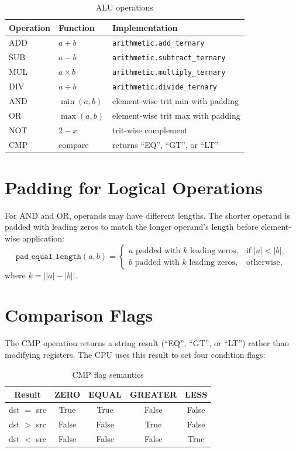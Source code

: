 \documentclass[10pt,a4paper,twoside]{book}
\begin{document}
\begin{table}[H]
\centering
\caption{ALU operations}
\label{tab:aluops}
\begin{tabular}{lll}
\toprule
Operation & Function & Implementation \\
\midrule
ADD & $a + b$ & \texttt{arithmetic.add\_ternary} \\
SUB & $a - b$ & \texttt{arithmetic.subtract\_ternary} \\
MUL & $a \times b$ & \texttt{arithmetic.multiply\_ternary} \\
DIV & $a \div b$ & \texttt{arithmetic.divide\_ternary} \\
AND & $\min(a,b)$ & element-wise trit min with padding \\
OR  & $\max(a,b)$ & element-wise trit max with padding \\
NOT & $2 - x$ & trit-wise complement \\
CMP & compare & returns ``EQ'', ``GT'', or ``LT'' \\
\bottomrule
\end{tabular}
\end{table}

\section{Padding for Logical Operations}

For AND and OR, operands may have different lengths. The shorter operand is padded
with leading zeros to match the longer operand's length before element-wise application:
\[
\texttt{pad\_equal\_length}(a,b) =
\begin{cases}
a\text{ padded with }k\text{ leading zeros}, & \text{if } |a| < |b|, \\
b\text{ padded with }k\text{ leading zeros}, & \text{otherwise},
\end{cases}
\]
where $k = \bigl||a| - |b|\bigr|$.

\section{Comparison Flags}

The CMP operation returns a string result (``EQ'', ``GT'', or ``LT'') rather than
modifying registers. The CPU uses this result to set four condition flags:

\begin{table}[H]
\centering
\caption{CMP flag semantics}
\label{tab:cmpflags}
\begin{tabular}{ccccc}
\toprule
Result & ZERO & EQUAL & GREATER & LESS \\
\midrule
dst $=$ src & True & True & False & False \\
dst $>$ src & False & False & True & False \\
dst $<$ src & False & False & False & True \\
\bottomrule
\end{tabular}
\end{table}
\end{document}
